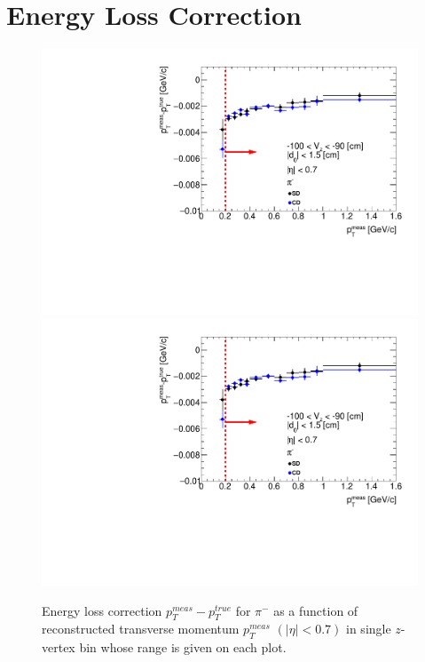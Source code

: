 
\chapter{Energy Loss Correction}\label{appendix:energyLoss}
\begin{figure}[H]
\caption[Energy loss correction for $\pi^-$ as a function of reconstructed transverse momentum $p_T^{meas}$.]{Energy loss correction $p_T^{meas}-p_T^{true}$ for $\pi^-$ as a function of reconstructed transverse momentum $p_T^{meas}$ $\left(|\eta|<0.7\right)$ in single $z$-vertex bin whose range is given on each plot.}\label{fig:energyLossPrimaryPi_minus}
\centering
\parbox{0.329\textwidth}{
  \centering
  \includegraphics[width=\linewidth,page=3]{graphics/energyLoss/energyLoss3D_OnePrtAlso.pdf}\\
  \includegraphics[width=\linewidth,page=6]{graphics/energyLoss/energyLoss3D_OnePrtAlso.pdf}\\
}
\end{figure}
